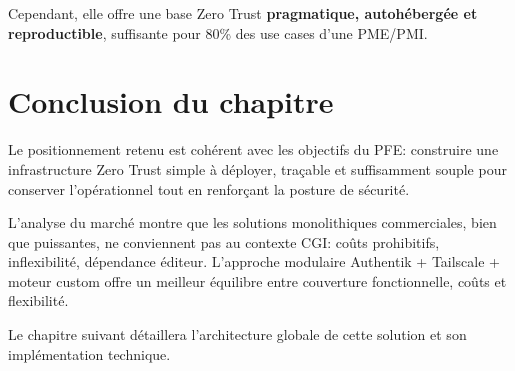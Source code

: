 Cependant, elle offre une base Zero Trust \textbf{pragmatique, autohébergée et reproductible}, suffisante pour 80\% des use cases d'une PME/PMI.

\section{Conclusion du chapitre}

Le positionnement retenu est cohérent avec les objectifs du PFE: construire une infrastructure Zero Trust simple à déployer, traçable et suffisamment souple pour conserver l'opérationnel tout en renforçant la posture de sécurité.

L'analyse du marché montre que les solutions monolithiques commerciales, bien que puissantes, ne conviennent pas au contexte CGI: coûts prohibitifs, inflexibilité, dépendance éditeur. L'approche modulaire Authentik + Tailscale + moteur custom offre un meilleur équilibre entre couverture fonctionnelle, coûts et flexibilité.

Le chapitre suivant détaillera l'architecture globale de cette solution et son implémentation technique.